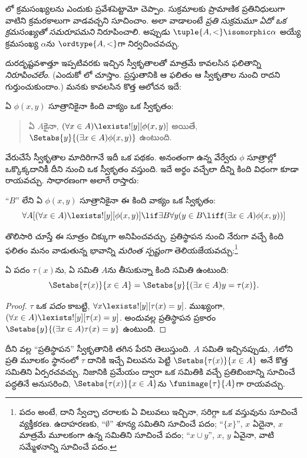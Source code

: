 \documentclass[../../../include/open-logic-section]{subfiles}
\begin{document}

లో క్రమసంఖ్యలను ఎందుకు
ప్రవేశపెట్టామో చెప్పాం. సుక్రమాలకు ప్రామాణిక ప్రతినిధులుగా
వాటిని క్రమరకాలుగా వాడవచ్చని సూచించాం.
అలా వాడాలంటే \emph{ప్రతి సుక్రమమూ ఏదో ఒక
క్రమసంఖ్యతో సమరూపమని} నిరూపించాలి. అప్పుడు
$\tuple{A, <} \isomorphic \alpha$ అయ్యే
క్రమసంఖ్య $\alpha$ను $\ordtype{A, <}$గా నిర్వచించవచ్చు.

దురదృష్టవశాత్తూ ఇప్పటివరకు ఇచ్చిన స్వీకృతాలతో మాత్రమే
కావలసిన ఫలితాన్ని \emph{నిరూపించలేం}.
(ఎందుకో లో చూస్తాం.
ప్రస్తుతానికి ఆ ఫలితం ఆ స్వీకృతాల నుంచి రాదని గుర్తుంచుకుందాం.)
మనకు కావలసిన కొత్త ఆలోచన ఇదే:

\begin{axiom}[ప్రతిస్థాపన స్వీకృతాల పథకం]
ఏ $\phi(x, y)$ సూత్రానికైనా
కింది వాక్యం ఒక స్వీకృతం:
\begin{quote}
	ఏ $A$కైనా,
	$(\forall x \in A)\lexists![y][\phi(x,y)]$
	అయితే,
	$\Setabs{y}{(\exists x \in A)\phi(x,y)}$
	ఉంటుంది.
\end{quote}
\end{axiom}
\noindent
వేరుచేసే స్వీకృతాల మాదిరిగానే ఇదీ ఒక పథకం.
అనంతంగా ఉన్న వేర్వేరు $\phi$ సూత్రాల్లో ఒక్కొక్కదానికీ
దీని నుంచి ఒక స్వీకృతం వస్తుంది. ఇదే అర్థం వచ్చేలా
దీన్ని కింది విధంగా కూడా రాయవచ్చు. సాధారణంగా అలాగే రాస్తారు:

\begin{defish}
``$B$'' లేని ఏ
$\phi(x,y)$ సూత్రానికైనా
ఈ కింది వాక్యం ఒక స్వీకృతం:
\[
\forall A[(\forall x \in A)\lexists![y][\phi(x,y)] \lif \exists B\forall y (y \in B \liff (\exists x \in A)\phi(x,y))]
\]
\end{defish}

తొలిసారి చూస్తే ఈ సూత్రం చిక్కుగా అనిపించవచ్చు.
ప్రతిస్థాపన నుంచి నేరుగా వచ్చే కింది ఫలితం మనం వాడుతున్న భావాన్ని
\emph{మరింత స్పష్టంగా} తెలియజేయవచ్చు:\footnote{పదం
అంటే, దాని స్వేచ్ఛా చరాలకు ఏ విలువలు ఇచ్చినా,
సరిగ్గా ఒక వస్తువును సూచించే వ్యక్తీకరణ. ఉదాహరణకు,
``$\emptyset$'' శూన్య
సమితిని సూచించే పదం;
``$\{x\}$'', $x$ ఏదైనా,
$x$ మాత్రమే మూలకంగా ఉన్న సమితిని
సూచించే పదం; ``$x \cup y$'',
$x$, $y$ ఏవైనా,
వాటి సమ్మేళనాన్ని
సూచించే పదం.}

\begin{cor}
ఏ పదం $\tau(x)$ను, ఏ సమితి $A$ను తీసుకున్నా
కింది సమితి ఉంటుంది:
\[
	\Setabs{\tau(x)}{x \in A} = \Setabs{y}{(\exists x \in A)y = \tau(x)}.
\]
\end{cor}

\begin{proof}
$\tau$ ఒక \emph{పదం}
కాబట్టి,
$\forall x \lexists![y][\tau(x) = y]$.
ముఖ్యంగా,
$(\forall x \in A)\lexists![y][\tau(x) = y]$.
అందువల్ల ప్రతిస్థాపన
ప్రకారం
$\Setabs{y}{(\exists x \in A)\tau(x) = y}$
ఉంటుంది.
\end{proof}
\noindent
దీని వల్ల ``ప్రతిస్థాపన''
స్వీకృతానికి తగిన పేరని
తెలుస్తుంది. $A$ సమితి
ఇచ్చినప్పుడు, $A$లోని ప్రతి
మూలకం స్థానంలో $\tau$ దానికి ఇచ్చే విలువను పెట్టి
$\Setabs{\tau(x)}{x \in A}$
అనే కొత్త సమితిని
ఏర్పరచవచ్చు. నిజానికి
ప్రమేయం ద్వారా ఒక సమితికి వచ్చే ప్రతిబింబాన్ని సూచించే
పద్ధతినే అనుసరించి,
$\Setabs{\tau(x)}{x \in A}$ను
$\funimage{\tau}{A}$గా
రాయవచ్చు.
\end{document}
